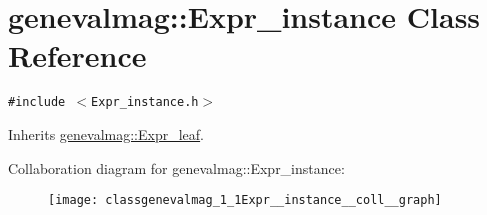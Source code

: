 \hypertarget{classgenevalmag_1_1Expr__instance}{
\section{genevalmag::Expr\_\-instance Class Reference}
\label{classgenevalmag_1_1Expr__instance}
}
{\tt \#include $<$Expr\_\-instance.h$>$}

Inherits \hyperlink{classgenevalmag_1_1Expr__leaf}{genevalmag::Expr\_\-leaf}.

Collaboration diagram for genevalmag::Expr\_\-instance:\nopagebreak
\begin{figure}[H]
\begin{center}
\leavevmode
\texttt{[image: classgenevalmag\_1\_1Expr\_\_instance\_\_coll\_\_graph]}
\end{center}
\end{figure}
